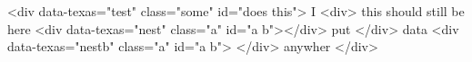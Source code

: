 <div data-texas="test" class="some" id="does this">
  I
  <div>
    this should still be here
    <div data-texas="nest" class="a" id="a b"></div>
    put
  </div>
  data
  <div data-texas="nestb" class="a" id="a b">
  </div>
  anywher
</div>
